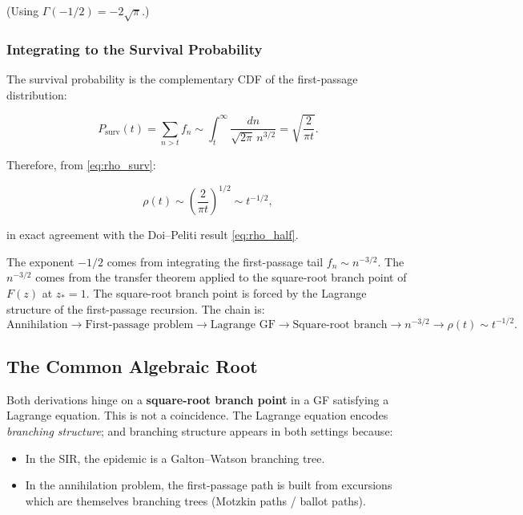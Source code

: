 \documentclass[11pt,a4paper]{article}
\theoremstyle{definition}
\begin{document}
(Using $\Gamma(-1/2) = -2\sqrt{\pi}$.)

\subsubsection{Integrating to the Survival Probability}

The survival probability is the complementary CDF of the first-passage distribution:

\begin{equation}
  P_{\mathrm{surv}}(t) = \sum_{n > t} f_n \sim \int_t^\infty \frac{dn}{\sqrt{2\pi}\, n^{3/2}}
  = \sqrt{\frac{2}{\pi t}}.
  \label{eq:surv_asymptotics}
\end{equation}

Therefore, from \eqref{eq:rho_surv}:

\begin{equation}
  \boxed{\rho(t) \sim \left(\frac{2}{\pi t}\right)^{1/2} \sim t^{-1/2},}
  \label{eq:rho_ac}
\end{equation}

in exact agreement with the Doi--Peliti result \eqref{eq:rho_half}.

\begin{keybox}
The exponent $-1/2$ comes from integrating the first-passage tail $f_n \sim n^{-3/2}$.
The $n^{-3/2}$ comes from the transfer theorem applied to the square-root branch
point of $F(z)$ at $z_* = 1$. The square-root branch point is forced by the
Lagrange structure of the first-passage recursion. The chain is:
\[
  \text{Annihilation} \to \text{First-passage problem} \to
  \text{Lagrange GF} \to \text{Square-root branch} \to
  n^{-3/2} \to \rho(t) \sim t^{-1/2}.
\]
\end{keybox}

\subsection{The Common Algebraic Root}

Both derivations hinge on a \textbf{square-root branch point} in a GF satisfying a
Lagrange equation. This is not a coincidence. The Lagrange equation encodes
\emph{branching structure}; and branching structure appears in both settings because:

\begin{itemize}[leftmargin=2em]
  \item In the SIR, the epidemic is a Galton--Watson branching tree.
  \item In the annihilation problem, the first-passage path is built from
        excursions which are themselves branching trees (Motzkin paths / ballot paths).
\end{itemize}
\end{document}
